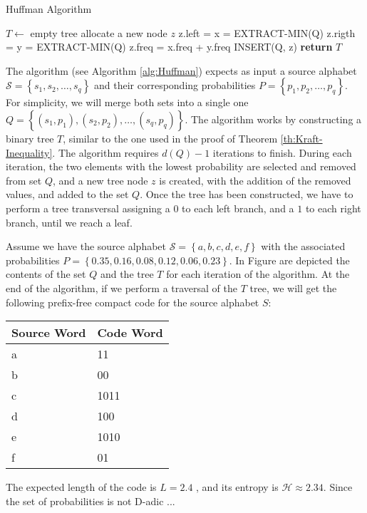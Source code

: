 \begin{algorithm}
\caption{Huffman Algorithm}
\label{alg:Huffman}
\begin{algorithmic}
    \State $T \gets$ empty tree
        \State allocate a new node $z$
        \State z.left = x = EXTRACT-MIN(Q)
        \State z.rigth = y = EXTRACT-MIN(Q)
        \State z.freq = x.freq + y.freq
        \State INSERT(Q, z)
    \EndFor
    \State \textbf{return} $T$
\EndProcedure
\end{algorithmic}
\end{algorithm}

The algorithm (see Algorithm \ref{alg:Huffman}) expects as input a source alphabet $\mathcal{S}=\left\{ s_{1},s_{2},\ldots,s_{q}\right\}$ and their corresponding probabilities $P = \left\{ p_{1}, p_{2}, \ldots, p_{q} \right\}$. For simplicity, we will merge both sets into a single one $Q = \left\{ (s_{1}, p_{1}), (s_{2}, p_{2}), \ldots, (s_{q}, p_{q}) \right\}$. The algorithm works by constructing a binary tree $T$, similar to the one used in the proof of Theorem \ref{th:Kraft-Inequality}. The algorithm requires $d(Q) - 1$ iterations to finish. During each iteration, the two elements with the lowest probability are selected and removed from set $Q$, and a new tree node $z$ is created, with the addition of the removed values, and added to the set $Q$. Once the tree has been constructed, we have to perform a tree transversal assigning a $0$ to each left branch, and a $1$ to each right branch, until we reach a leaf.

\begin{example}
Assume we have the source alphabet $\mathcal{S}=\left\{a, b, c, d, e, f\right\}$ with the associated probabilities $P = \left\{0.35, 0.16, 0.08, 0.12, 0.06, 0.23 \right\}$. In Figure \label{fig:Huffman-Algorithm} are depicted the contents of the set $Q$ and the tree $T$ for each iteration of the algorithm. At the end of the algorithm, if we perform a traversal of the $T$ tree, we will get the following prefix-free compact code for the source alphabet $S$: 

\bigskip

\centering
\begin{tabular}{l l}
\toprule
\textbf{Source Word} & \textbf{Code Word} \\
\midrule
a & 11   \\
b & 00   \\
c & 1011 \\
d & 100  \\
e & 1010 \\
f & 01   \\
\bottomrule
\end{tabular}

\bigskip

The expected length of the code is $L = 2.4$ , and its entropy is $\mathcal{H} \approx 2.34$. Since the set of probabilities is not D-adic ...


\end{example}

